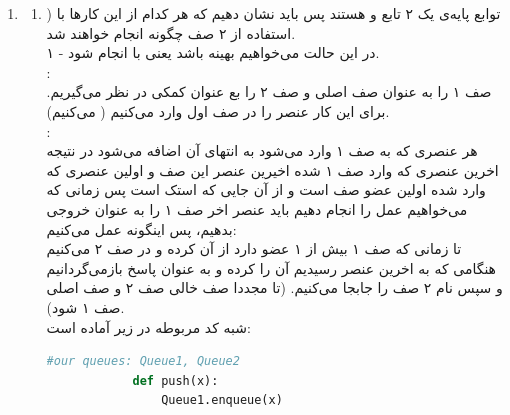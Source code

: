 \documentclass{article}
\begin{document}
\begin{enumerate}
\begin{latin}
\begin{flushright}
\begin{lstlisting}[language=Python]
	while (curr_petrol <0 || !(Q.front == Q.rear) ):

		while curr_petrol <0 and !(Q.front == Q.rear):

			curr_petrol = curr_petrol - (Q.front.petrol - Q.front.distance)
			Q.dequeue()

			#if the first station is being considered as an starting point again, it means that all stations have been checked and there is no possible way to make a tour around the city
			if Q.front==station[0]:
				return -1;

		i += 1
		if i >= len(stations):
			i = 0
		curr_petron = curr_petrol + (Q.rear.petrol - Q.rear.distance)
		Q.enqueue(stations[i])

	\end{lstlisting}
	\end{flushright}								
	\end{latin}
	\item
	\begin{enumerate}
		\item) توابع پایه‌ی یک  ۲ تابع  و  هستند پس باید نشان دهیم که هر کدام از این کار‌ها با استفاده از ۲ صف چگونه انجام خواهند شد.\\
		۱ - در این حالت می‌خواهیم  بهینه باشد یعنی با  انجام شود.\\
			: \\
			صف ۱ را به عنوان صف اصلی و صف ۲ را بع عنوان کمکی در نظر می‌گیریم. 
			برای این کار عنصر را در صف اول وارد می‌کنیم ( می‌کنیم).\\
			:\\
			هر عنصری که به صف ۱ وارد می‌شود به انتهای آن اضافه می‌شود در نتیجه اخرین عنصری که وارد صف ۱ شده اخیرین عنصر این صف و اولین عنصری که وارد شده اولین عضو صف است و از آن‌ جایی که استک  است پس زمانی که می‌خواهیم عمل  را انجام دهیم باید عنصر اخر صف ۱ را به عنوان خروجی بدهیم، پس اینگونه عمل می‌‌کنیم:\\
			تا زمانی که صف ۱ بیش از ۱ عضو دارد از آن  کرده و در صف ۲  می‌کنیم هنگامی که به اخرین عنصر رسیدیم آن را  کرده و به عنوان پاسخ  بازمی‌گردانیم و سپس نام ۲ صف را جابجا می‌کنیم. (تا مجددا صف خالی صف ۲ و صف اصلی صف ۱ شود).\\
			شبه کد مربوطه در زیر آماده است:
			\begin{latin}
			\begin{flushright}				
			\begin{lstlisting}[language=Python]
			#our queues: Queue1, Queue2
			def push(x):
				Queue1.enqueue(x)


\end{lstlisting}
\end{flushright}
\end{latin}
\end{enumerate}
\end{enumerate}
\end{document}
